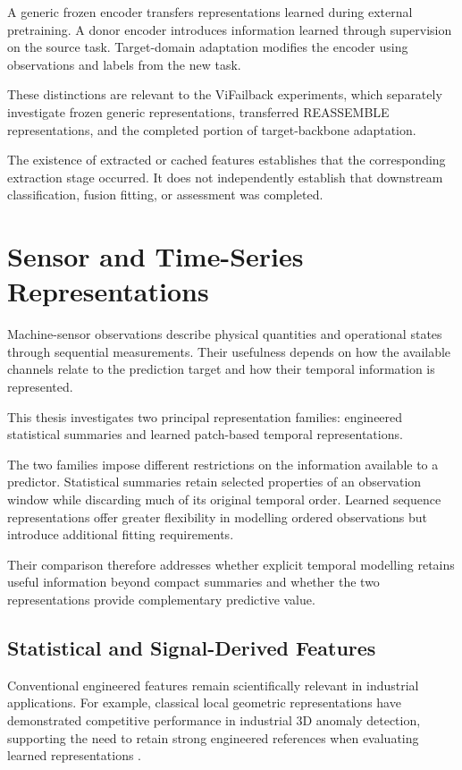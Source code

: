 A generic frozen encoder transfers representations learned during external pretraining. A donor encoder introduces information learned through supervision on the source task. Target-domain adaptation modifies the encoder using observations and labels from the new task.

These distinctions are relevant to the ViFailback experiments, which separately investigate frozen generic representations, transferred REASSEMBLE representations, and the completed portion of target-backbone adaptation.

The existence of extracted or cached features establishes that the corresponding extraction stage occurred. It does not independently establish that downstream classification, fusion fitting, or assessment was completed.

\section{Sensor and Time-Series Representations}

Machine-sensor observations describe physical quantities and operational states through sequential measurements. Their usefulness depends on how the available channels relate to the prediction target and how their temporal information is represented.

This thesis investigates two principal representation families: engineered statistical summaries and learned patch-based temporal representations.

The two families impose different restrictions on the information available to a predictor. Statistical summaries retain selected properties of an observation window while discarding much of its original temporal order. Learned sequence representations offer greater flexibility in modelling ordered observations but introduce additional fitting requirements.

Their comparison therefore addresses whether explicit temporal modelling retains useful information beyond compact summaries and whether the two representations provide complementary predictive value.

\subsection{Statistical and Signal-Derived Features}

Conventional engineered features remain scientifically relevant in industrial applications. For example, classical local geometric representations have demonstrated competitive performance in industrial 3D anomaly detection, supporting the need to retain strong engineered references when evaluating learned representations \parencite{Horwitz2023Back}.

